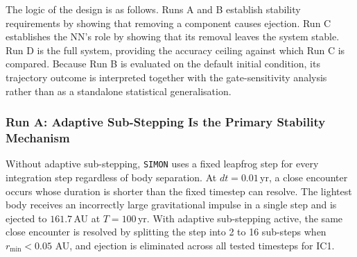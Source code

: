 \documentclass[12pt]{article}
\begin{document}
\begin{table}[H]
\centering
\caption{Four-run ablation framework. Each run removes or replaces exactly one component.
Run D is the full SIMON system and serves as the reference configuration. All runs
use IC1 and $T = 100$ yr under the same evaluation protocol. Run A reports the
adaptive-off failure observed in the timestep-grid sweep, where $dt=0.01$ yr
produces ejection. Runs A, C, and D use the same SIMON weights; Run B uses a
separately trained Vector NN baseline because the force-direction architecture is
changed.}
\label{tab:ablation}
\end{table}

\noindent The logic of the design is as follows. Runs A and B establish stability requirements by
showing that removing a component causes ejection. Run C establishes the NN’s role by
showing that its removal leaves the system stable. Run D is the full system, providing
the accuracy ceiling against which Run C is compared. Because Run B is evaluated on the
default initial condition, its trajectory outcome is interpreted together with the
gate-sensitivity analysis rather than as a standalone statistical generalisation.

\subsubsection{Run A: Adaptive Sub-Stepping Is the Primary Stability Mechanism}
\label{sec:run_a}

Without adaptive sub-stepping, \texttt{SIMON} uses a fixed leapfrog step for every
integration step regardless of body separation. At $dt = 0.01$\,yr, a close encounter
occurs whose duration is shorter than the fixed timestep can resolve. The lightest
body receives an incorrectly large gravitational impulse in a single step and is ejected
to $161.7$\,AU at $T = 100$\,yr. With adaptive sub-stepping active, the same close encounter is resolved by splitting the step
into 2 to 16 sub-steps when $r_{\min} < 0.05$ AU, and ejection is eliminated across all tested
timesteps for IC1.
\end{document}
